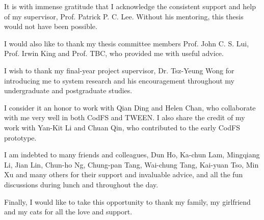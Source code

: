 It is with immense gratitude that I acknowledge the consistent support and help
of my supervisor, Prof. Patrick P. C. Lee. Without his mentoring, this thesis
would not have been possible.

I would also like to thank my thesis committee members Prof. John C. S. Lui,
Prof. Irwin King and Prof. TBC, who provided me with useful advice.

I wish to thank my final-year project supervisor, Dr. Tsz-Yeung Wong for
introducing me to system research and his encouragement throughout my
undergraduate and postgraduate studies.

I consider it an honor to work with Qian Ding and Helen Chan, who collaborate
with me very well in both CodFS and TWEEN. I also share the credit of my work
with Yan-Kit Li and Chuan Qin, who contributed to the early CodFS prototype.  

I am indebted to many friends and colleagues, Dun Ho, Ka-chun Lam, Mingqiang Li,
Jian Lin, Chun-ho Ng, Chung-pan Tang, Wai-chung Tang, Kai-yuan Tso, Min Xu and
many others for their support and invaluable advice, and all the fun discussions
during lunch and throughout the day. 

Finally, I would like to take this opportunity to thank my family, my girlfriend
and my cats for all the love and support.
